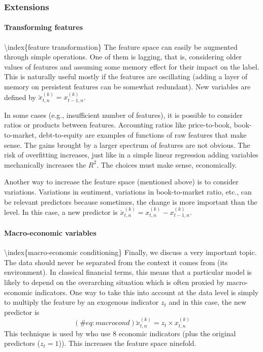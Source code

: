 \subsubsection{Extensions}

\paragraph{Transforming features}

{\textbackslash}index\{feature transformation\}
The feature space can easily be augmented through simple operations. One of them is lagging, that is, considering older values of features and assuming some memory effect for their impact on the label. This is naturally useful mostly if the features are oscillating (adding a layer of memory on persistent features can be somewhat redundant). New variables are defined by $\breve{x}_{t,n}^{(k)}=x_{t -1,n}^{(k)}$.

In some cases (e.g., insufficient number of features), it is possible to consider ratios or products between features. Accounting ratios like price-to-book, book-to-market, debt-to-equity are examples of functions of raw features that make sense. The gains brought by a larger spectrum of features are not obvious. The risk of overfitting increases, just like in a simple linear regression adding variables mechanically increases the $R^2$. The choices must make sense, economically.

Another way to increase the feature space (mentioned above) is to consider variations. Variations in sentiment, variations in book-to-market ratio, etc., can be relevant predictors because sometimes, the change is more important than the level. In this case, a new predictor is $\breve{x}_{t,n}^{(k)}=x_{t,n}^{(k)} -x_{t -1,n}^{(k)}$.

\paragraph{Macro-economic variables}\label{sec_macrovar}

{\textbackslash}index\{macro-economic conditioning\}
Finally, we discuss a very important topic. The data should never be separated from the context it comes from (its environment). In classical financial terms, this means that a particular model is likely to depend on the overarching situation which is often proxied by macro-economic indicators. One way to take this into account at the data level is simply to multiply the feature by an exogenous indicator $z_{t}$ and in this case, the new predictor is
\begin{equation}
(\#eq:macrocond)
\breve{x}_{t,n}^{(k)}=z_t \times x_{t,n}^{(k)}
\end{equation}
This technique is used by \cite{gu2018empirical} who use 8 economic indicators (plus the original predictors ($z_t=1$)). This increases the feature space ninefold.

